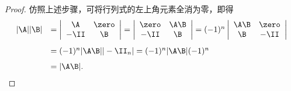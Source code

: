 \begin{proof}
  仿照上述步骤，可将行列式的左上角元素全消为零，即得
  $$
  \begin{array}{rl}
    |\A||\B| &  = \left|
               \begin{array}{cc}
                 \A & \zero\\
                 -\II & \B
               \end{array}
                        \right|  = \left|
                        \begin{array}{cc}
                          \zero & \A\B \\
                          -\II & \B
                        \end{array}
                                 \right| = (-1)^n\left|
                                 \begin{array}{cc}
                                   \A\B & \zero\\
                                   \B   & -\II
                                 \end{array}
                                          \right| \\[0.2in]
             &  = (-1)^n |\A\B||-\II_n|  = (-1)^n |\A\B|(-1)^n \\[0.1in]
             &  = |\A\B|.  
  \end{array}
  $$
\end{proof}  %

